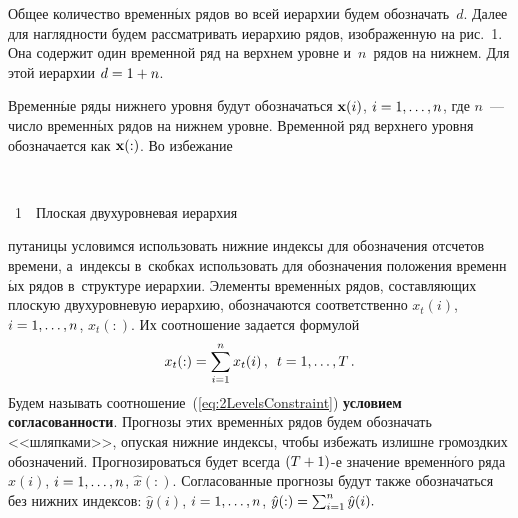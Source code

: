 \begin{multicols}{2}
Общее количество временн$\acute{\mbox{ы}}$х рядов во всей иерархии будем
обозначать~$d$. Далее для наглядности будем рассматривать иерархию
рядов, изображенную на рис.~1. Она
содержит один временной ряд на верхнем уровне и~$n$~рядов на
нижнем. Для этой иерархии $d \hm= 1\hm + n$.

Временн$\acute{\mbox{ы}}$е ряды нижнего уровня будут обозначаться $\mathbf{x}(i)$, $i \hm= 1,
\ldots, n$, где $n$~--- число временн$\acute{\mbox{ы}}$х рядов на нижнем
уровне. Временной ряд верхнего уровня обозначается как $\mathbf{x}(:)$. Во
избежание\linebreak\vspace*{-12pt}

\pagebreak

\begin{center}  %
\vspace*{-1pt}
\mbox{%
 \epsfxsize=76.721mm
 }


\vspace*{3pt}

{{\figurename~1}\ \ \small{Плоская двухуровневая иерархия}}

\end{center}

\vspace*{6pt}


\addtocounter{figure}{1}




\noindent
 путаницы условимся использовать нижние индексы для
обозначения отсчетов времени, а~индексы в~скобках использовать для
обозначения положения временн$\acute{\mbox{ы}}$х рядов в~структуре иерархии.
Элементы временн$\acute{\mbox{ы}}$х рядов, составляющих плоскую двух\-уров\-не\-вую
иерархию, обозначаются соответственно $x_t(i)$, $i \hm= 1, \ldots,
n$, $x_t(:)$. Их соотношение задается формулой
\begin{equation}
\label{eq:2LevelsConstraint}
    x_t(:) = \sum\limits_{i = 1}^n x_t(i)\,, \enskip t = 1, \ldots, T\,.
\end{equation}
Будем называть соотношение~(\ref{eq:2LevelsConstraint})
\textbf{условием согласованности}. Прогнозы этих временн$\acute{\mbox{ы}}$х рядов
будем обозначать <<шляпками>>, опуская нижние индексы, чтобы
избежать излишне громоздких обозначений. Прогнозироваться будет
всегда $(T \hm+ 1)$-е значение временн$\acute{\mbox{о}}$го ряда
$\hat{x}(i)$, $i \hm= 1, \ldots, n$, $\hat{x}(:).$
Согласованные прогнозы будут также обозначаться без нижних
индексов: $\hat{y}(i)$, $i \hm= 1, \ldots, n$, $\hat{y}(:) \hm=
\sum\nolimits_{i = 1}^n \hat{y}(i).$


\end{multicols}
